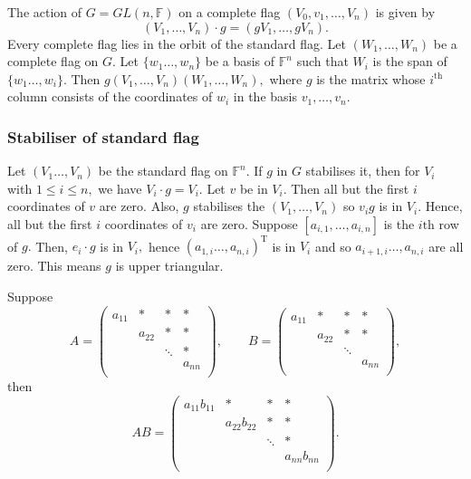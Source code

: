 
The action of $G = GL(n,\mathbb{F})$ on a complete flag $(V_0, v_1, \dotsc, V_n)$ is given by
$$(V_1, \dotsc, V_n) \cdot g = (g V_1, \dotsc, g V_n).$$
Every complete flag lies in the orbit of the standard flag. Let 
$(W_1, \dotsc, W_n)$ be a complete flag on $G.$ 
Let $\{ w_1   \dotsc, w_n\}$ be a basis of $\mathbb{F}^n$ such that
$W_i $ is the span of $\{w_1   \dotsc,w_i \}.$ Then
$g (V_1, \dotsc , V_n) (W_1, \dotsc, W_n),$
where $g$ is the matrix whose $i^\text{th}$ column consists
of the coordinates of $w_i$ in the basis $v_1  , \dotsc, v_n.$

\subsubsection{Stabiliser of standard flag}
Let $(V_1   \dotsc,V_n)$ be the standard flag on $\mathbb{F}^n.$ If
$g$ in $G$ stabilises it, then for $V_i$ with $1 \leq i \leq n,$ we
have
$V_i \cdot g = V_i.$
Let $v$ be in $V_i.$ Then all but the first $i$ coordinates of $v$ 
are zero. Also, $g$ stabilises the $(V_1, \dotsc,V_n)$ so $v_i g$ is in
$V_i.$ Hence, all but the first $i$ coordinates of $v_i$ are zero.
Suppose $[a_{i,1}, \dotsc, a_{i,n}]$ is the $i\text{th}$ row of $g.$
Then, $e_i \cdot g$ is in $V_i,$ hence $(a_{1,i}   \dotsc, a_{n,i})^\text{T}$ is in $V_i$ and so $a_{i+1,i}   \dotsc,a_{n,i}$ are all zero.
This means $g$ is upper triangular.

Suppose 
$$A = \begin{pmatrix}
	a_{11} & \ast &  \ast&  \ast\\
	       & a_{22} & \ast& \ast \\
	       && \ddots & \ast\\
	       &&&a_{nn}\\
\end{pmatrix}
, \qquad B = \begin{pmatrix}
	a_{11} &\ast& \ast &\ast  \\
	   & a_{22} & \ast&\ast  \\
	      && \ddots &\\
	       &&&a_{nn}\\
\end{pmatrix},
$$
then
$$
AB = \begin{pmatrix}
	a_{11} b_{11} & \ast &\ast & \ast\\
	      & a_{22} b_{22} &\ast& \ast \\
	      &&\ddots & \ast\\
	      &&& a_{nn} b_{nn}\\
\end{pmatrix}.$$

